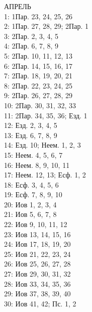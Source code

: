 \documentclass[fontsize=16pt,letterpaper,DIV=6]{scrartcl}
\begin{document}
\begin{multicols}{2}
АПРЕЛЬ
\\  1: 1Пар. 23, 24, 25, 26
\\  2: 1Пар. 27, 28, 29; 2Пар. 1
\\  3: 2Пар. 2, 3, 4, 5
\\  4: 2Пар. 6, 7, 8, 9
\\  5: 2Пар. 10, 11, 12, 13
\\  6: 2Пар. 14, 15, 16, 17
\\  7: 2Пар. 18, 19, 20, 21
\\  8: 2Пар. 22, 23, 24, 25
\\  9: 2Пар. 26, 27, 28, 29
\\  10: 2Пар. 30, 31, 32, 33
\\  11: 2Пар. 34, 35, 36; Езд. 1
\\  12: Езд. 2, 3, 4, 5
\\  13: Езд. 6, 7, 8, 9
\\  14: Езд. 10; Неем. 1, 2, 3
\\  15: Неем. 4, 5, 6, 7
\\  16: Неем. 8, 9, 10, 11
\\  17: Неем. 12, 13; Есф. 1, 2
\\  18: Есф. 3, 4, 5, 6
\\  19: Есф. 7, 8, 9, 10
\\  20: Иов 1, 2, 3, 4
\\  21: Иов 5, 6, 7, 8
\\  22: Иов 9, 10, 11, 12
\\  23: Иов 13, 14, 15, 16
\\  24: Иов 17, 18, 19, 20
\\  25: Иов 21, 22, 23, 24
\\  26: Иов 25, 26, 27, 28
\\  27: Иов 29, 30, 31, 32
\\  28: Иов 33, 34, 35, 36
\\  29: Иов 37, 38, 39, 40
\\  30: Иов 41, 42; Пс. 1, 2
\end{multicols}
\clearpage
\end{document}
